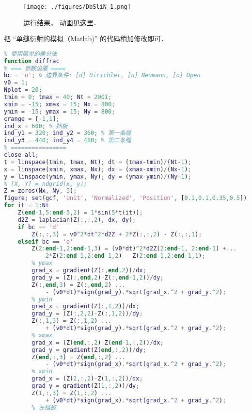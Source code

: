 
\begin{issues}
\issueDraft
\end{issues}


\begin{figure}[ht]
\centering
\texttt{[image: ./figures/DbSliN\_1.png]}
\caption{运行结果， 动画见\href{https://wuli.wiki/apps/db_slit.html}{这里}．} \label{DbSliN_fig1}
\end{figure}

把 “单缝衍射的模拟（Matlab)” 的代码稍加修改即可．
\begin{lstlisting}[language=matlab, caption=double\_slit.m]
% 双缝干涉的模拟
% 使用简单的差分法
function diffrac
% === 参数设置 ====
bc = 'o'; % 边界条件: [d] Dirichlet, [n] Neumann, [o] Open
v0 = 1;
Nplot = 20;
tmin = 0; tmax = 40; Nt = 2001;
xmin = -15; xmax = 15; Nx = 800;
ymin = -15; ymax = 15; Ny = 800;
crange = [-1,1];
ind_x = 600; % 挡板
ind_y1 = 320; ind_y2 = 360; % 第一条缝
ind_y3 = 440; ind_y4 = 480; % 第二条缝
% ================
close all;
t = linspace(tmin, tmax, Nt); dt = (tmax-tmin)/(Nt-1);
x = linspace(xmin, xmax, Nx); dx = (xmax-xmin)/(Nx-1);
y = linspace(ymin, ymax, Ny); dy = (ymax-ymin)/(Ny-1);
% [X, Y] = ndgrid(x, y);
Z = zeros(Nx, Ny, 3);
figure; set(gcf, 'Unit', 'Normalized', 'Position', [0.1,0.1,0.35,0.5]);
for it = 1:Nt
    Z(end-1,5:end-5,2) = 1*sin(5*t(it));
    d2Z = laplacian(Z(:,:,2), dx, dy);
    if bc == 'd'
        Z(:,:,3) = v0^2*dt^2*d2Z + 2*Z(:,:,2) - Z(:,:,1);
    elseif bc == 'o'
        Z(2:end-1,2:end-1,3) = (v0*dt)^2*d2Z(2:end-1, 2:end-1) +...
            2*Z(2:end-1,2:end-1,2) - Z(2:end-1,2:end-1,1);
        % ymax
        grad_x = gradient(Z(:,end,2))/dx;
        grad_y = (Z(:,end,2)-Z(:,end-1,2))/dy;
        Z(:,end,3) = Z(:,end,2) ...
            - (v0*dt)*sign(grad_y).*sqrt(grad_x.^2 + grad_y.^2);
        % ymin
        grad_x = gradient(Z(:,1,2))/dx;
        grad_y = (Z(:,2,2)-Z(:,1,2))/dy;
        Z(:,1,3) = Z(:,1,2) ...
            + (v0*dt)*sign(grad_y).*sqrt(grad_x.^2 + grad_y.^2);
        % xmax
        grad_x = (Z(end,:,2)-Z(end-1,:,2))/dx;
        grad_y = gradient(Z(end,:,2))/dy;
        Z(end,:,3) = Z(end,:,2) ...
            - (v0*dt)*sign(grad_x).*sqrt(grad_x.^2 + grad_y.^2);
        % xmin
        grad_x = (Z(2,:,2)-Z(1,:,2))/dx;
        grad_y = gradient(Z(1,:,2))/dy;
        Z(1,:,3) = Z(1,:,2) ...
            + (v0*dt)*sign(grad_x).*sqrt(grad_x.^2 + grad_y.^2);
        % 左挡板

\end{lstlisting}
